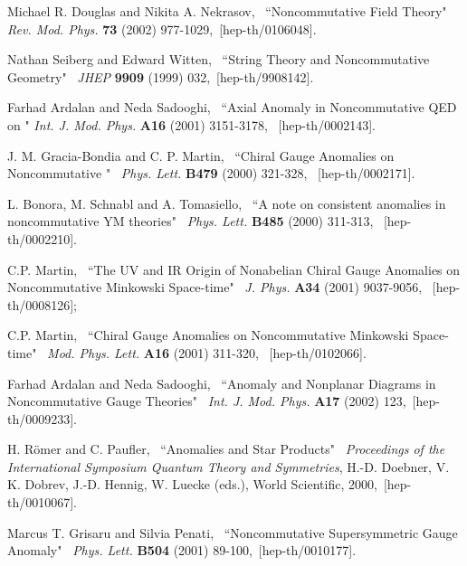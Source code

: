 \documentclass[a4paper,12pt]{article}
\begin{document}
\begin{thebibliography}{References}


Michael R. Douglas and Nikita A. Nekrasov, \, ``Noncommutative Field Theory" 
\, {\it Rev. Mod. Phys.} {\bf 73} (2002) 977-1029, \,[hep-th/0106048]. 

Nathan Seiberg and Edward Witten, \, ``String Theory and Noncommutative 
Geometry" \, {\it JHEP} {\bf 9909} (1999) 032, \,[hep-th/9908142]. 

Farhad Ardalan and Neda Sadooghi, \, ``Axial Anomaly in Noncommutative QED 
on \coordHE{}"  {\it Int. J. Mod. Phys.} {\bf A16} (2001) 3151-3178, \, 
[hep-th/0002143]. 

J. M. Gracia-Bondia and C. P. Martin, \, ``Chiral Gauge Anomalies on 
Noncommutative \coordHE{} " \, {\it Phys. Lett.} {\bf B479} (2000) 321-328, \,
[hep-th/0002171]. 

L. Bonora, M. Schnabl and A. Tomasiello, \, ``A note on consistent anomalies 
in noncommutative YM theories" \, {\it Phys. Lett.} {\bf B485} (2000) 311-313, 
\, [hep-th/0002210].

C.P. Martin, \, ``The UV and IR Origin of Nonabelian Chiral Gauge Anomalies on 
Noncommutative Minkowski Space-time" \, {\it J. Phys.} {\bf A34} (2001) 
9037-9056,  \, [hep-th/0008126]; 

C.P. Martin, \, ``Chiral Gauge Anomalies on Noncommutative Minkowski 
Space-time" \, {\it Mod. Phys. Lett.} {\bf A16} (2001) 311-320, \, 
[hep-th/0102066]. 

Farhad Ardalan and Neda Sadooghi, \, ``Anomaly and Nonplanar Diagrams in 
Noncommutative Gauge Theories" \, {\it Int. J. Mod. Phys.} {\bf A17} 
(2002) 123, \,[hep-th/0009233]. 


H. R\"omer and C. Paufler, \, ``Anomalies and Star Products" \,  
{\it Proceedings of the International Symposium Quantum Theory and Symmetries}, H.-D. Doebner, V. K. Dobrev, J.-D. Hennig, W. Luecke (eds.), 
World Scientific, 2000, \,[hep-th/0010067]. 

Marcus T. Grisaru and Silvia Penati, \, ``Noncommutative Supersymmetric Gauge 
Anomaly" \, {\it Phys. Lett.} {\bf B504} (2001) 89-100, \,[hep-th/0010177]. 


\end{thebibliography}
\end{document}
